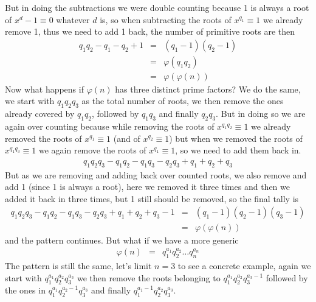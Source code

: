 \documentclass[aps,preprint,preprintnumbers,nofootinbib,showpacs,prd]{revtex4-1}
\newcommand{\nbea}{\begin{eqnarray*}}
\newcommand{\neea}{\end{eqnarray*}}
\begin{document}
But in doing the subtractions we were double counting because 1 is always a root of $x^d - 1 \equiv 0$ whatever $d$ is, so when subtracting the roots of $x^{q_1} \equiv 1$ we already remove 1, thus we need to add 1 back, the number of primitive roots are then
%
\nbea
q_1q_2 - q_1 - q_2 + 1 & = & (q_1 - 1)(q_2 - 1) \\
& = & \varphi(q_1q_2) \\
& = & \varphi(\varphi(n))
\neea
%
Now what happens if $\varphi(n)$ has three distinct prime factors? We do the same, we start with $q_1q_2q_3$ as the total number of roots, we then remove the ones already covered by $q_1q_2$, followed by $q_1q_3$ and finally $q_2q_3$. But in doing so we are again over counting because while removing the roots of $x^{q_1q_2} \equiv 1$ we already removed the roots of $x^{q_1} \equiv 1$ (and of $x^{q_2} \equiv 1$) but when we removed the roots of $x^{q_1q_3} \equiv 1$ we again remove the roots of $x^{q_1} \equiv 1$, so we need to add them back in.
%
\nbea
q_1q_2q_3 - q_1q_2 - q_1q_3 - q_2q_3 + q_1 + q_2 + q_3
\neea
%
But as we are removing and adding back over counted roots, we also remove and add 1 (since 1 is always a root), here we removed it three times and then we added it back in three times, but 1 still should be removed, so the final tally is
%
\nbea
q_1q_2q_3 - q_1q_2 - q_1q_3 - q_2q_3 + q_1 + q_2 + q_3 - 1 & = & (q_1 - 1)(q_2 - 1)(q_3 - 1) \\
& = & \varphi(\varphi(n))
\neea
%
and the pattern continues. But what if we have a more generic
%
\nbea
\varphi(n) & = & q_1^{a_1}q_2^{a_2} \dots q_n^{a_n}
\neea
%
The pattern is still the same, let's limit $n=3$ to see a concrete example, again we start with $q_1^{a_1}q_2^{a_2}q_3^{a_3}$ we then remove the roots belonging to $q_1^{a_1}q_2^{a_2}q_3^{a_3-1}$ followed by the ones in $q_1^{a_1}q_2^{a_2-1}q_3^{a_3}$ and finally $q_1^{a_1-1}q_2^{a_2}q_3^{a_3}$.
\end{document}
